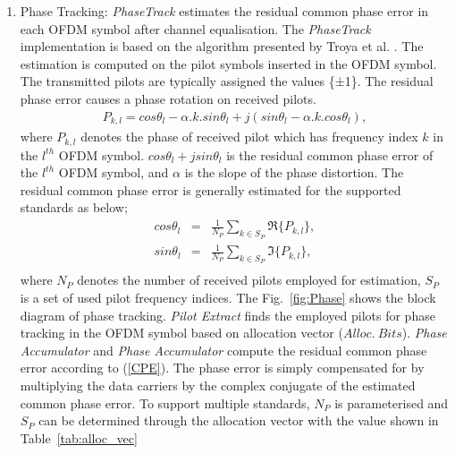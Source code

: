 \begin{enumerate}
\item{Phase Tracking:}
\emph{PhaseTrack} estimates the residual common phase error in each OFDM symbol after channel equalisation. 
The \emph{PhaseTrack} implementation is based on the algorithm presented by Troya et al. \cite{Troya2007}.
The estimation is computed on the pilot symbols inserted in the OFDM symbol. The transmitted pilots are typically assigned
the values \{±1\}. The residual phase error causes a phase rotation on received pilots.
\begin{eqnarray}
\label{PhaseTrack}
P_{k,l} = cos\theta_{l} -\alpha.k.sin \theta_{l} + j (sin\theta_{l} -\alpha.k.cos\theta_{l}),
\end{eqnarray}
where $P_{k,l}$ denotes the phase of received pilot which has frequency index $k$ in the $l^{th}$ OFDM symbol. 
$cos\theta_{l} + j sin\theta_{l}$ is the residual common phase error of the $l^{th}$ OFDM symbol, and $\alpha$ is the slope of the phase distortion.
The residual common phase error is generally estimated for the supported standards as below;
\begin{eqnarray}
\label{CPE}
cos\theta_{l} &=& \frac{1}{N_P} \sum_{k \in S_P} \Re\{P_{k,l}\}, \\ \nonumber
sin\theta_{l} &=& \frac{1}{N_P} \sum_{k \in S_P} \Im\{P_{k,l}\}, \\ \nonumber
\end{eqnarray}
where $N_P$ denotes the number of received pilots employed for estimation, $S_P$ is a set of used pilot frequency indices.
The Fig.~\ref{fig:Phase} shows the block diagram of phase tracking. \emph{Pilot Extract} finds the employed pilots for phase tracking in the OFDM symbol based on allocation vector ($Alloc.~Bits$).
\emph{Phase Accumulator} and \emph{Phase Accumulator} compute the residual common phase error according to (\ref{CPE}).
The phase error is simply compensated for by multiplying the data carriers by the complex conjugate of the estimated common phase error.
To support multiple standards, $N_P$ is parameterised and $S_P$ can be determined through the allocation vector with the value shown in Table~\ref{tab:alloc_vec}


\end{enumerate}
